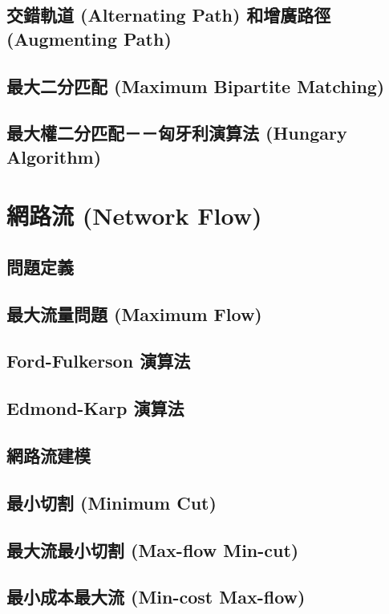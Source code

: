 \subsection{交錯軌道 (Alternating Path) 和增廣路徑 (Augmenting Path)}
\subsection{最大二分匹配 (Maximum Bipartite Matching)}
\subsection{最大權二分匹配－－匈牙利演算法 (Hungary Algorithm)}

\section{網路流 (Network Flow)}
\subsection{問題定義}
\subsection{最大流量問題 (Maximum Flow)}
\subsection{Ford-Fulkerson 演算法}
\subsection{Edmond-Karp 演算法}
\subsection{網路流建模}
\subsection{最小切割 (Minimum Cut)}
\subsection{最大流最小切割 (Max-flow Min-cut)}
\subsection{最小成本最大流 (Min-cost Max-flow)}